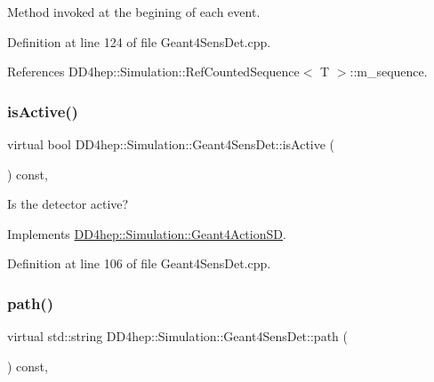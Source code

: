 Method invoked at the begining of each event. 



Definition at line 124 of file Geant4\+Sens\+Det.\+cpp.



References D\+D4hep\+::\+Simulation\+::\+Ref\+Counted\+Sequence$<$ T $>$\+::m\+\_\+sequence.

\hypertarget{class_d_d4hep_1_1_simulation_1_1_geant4_sens_det_a317a03e948f5b1cace52ed1ec8600292}{}\label{class_d_d4hep_1_1_simulation_1_1_geant4_sens_det_a317a03e948f5b1cace52ed1ec8600292} 
\subsubsection{\texorpdfstring{is\+Active()}{isActive()}}
{\footnotesize\ttfamily virtual bool D\+D4hep\+::\+Simulation\+::\+Geant4\+Sens\+Det\+::is\+Active (\begin{DoxyParamCaption}{ }\end{DoxyParamCaption}) const\hspace{0.3cm}{\ttfamily [inline]}, {\ttfamily [virtual]}}



Is the detector active? 



Implements \hyperlink{class_d_d4hep_1_1_simulation_1_1_geant4_action_s_d_a2c3791fc610294f1d3fc9ff6fe0e755f}{D\+D4hep\+::\+Simulation\+::\+Geant4\+Action\+SD}.



Definition at line 106 of file Geant4\+Sens\+Det.\+cpp.

\hypertarget{class_d_d4hep_1_1_simulation_1_1_geant4_sens_det_af199492ba6d537d22ae3fcf5e6dddac3}{}\label{class_d_d4hep_1_1_simulation_1_1_geant4_sens_det_af199492ba6d537d22ae3fcf5e6dddac3} 
\subsubsection{\texorpdfstring{path()}{path()}}
{\footnotesize\ttfamily virtual std\+::string D\+D4hep\+::\+Simulation\+::\+Geant4\+Sens\+Det\+::path (\begin{DoxyParamCaption}{ }\end{DoxyParamCaption}) const\hspace{0.3cm}{\ttfamily [inline]}, {\ttfamily [virtual]}}



